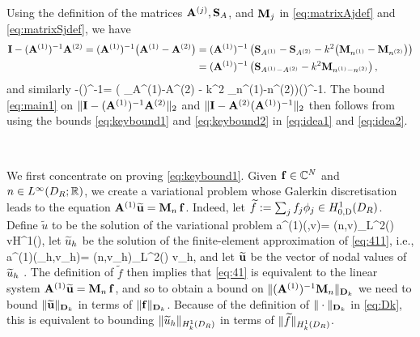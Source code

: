 Using the definition of the matrices $\mathbf{A}^{(j)}, \mathbf{S}_A$, and $\mathbf{M}_{j}$ in \cref{eq:matrixAjdef} and \cref{eq:matrixSjdef}, we have
\begin{align}\nonumber
\mathbf{I} - (\mathbf{A}^{(1)})^{-1}\mathbf{A}^{(2)} = (\mathbf{A}^{(1)})^{-1}\big(\mathbf{A}^{(1)}-\mathbf{A}^{(2)}\big) &=  (\mathbf{A}^{(1)})^{-1}\left( \mathbf{S}_{A^{(1)}} - \mathbf{S}_{A^{(2)}} - k^2 \big(\mathbf{M}_{n^{(1)}}-\mathbf{M}_{n^{(2)}}\big)\right)\\
&= (\mathbf{A}^{(1)})^{-1}\left( \mathbf{S}_{A^{(1)}-A^{(2)}} - k^2 \mathbf{M}_{n^{(1)}-n^{(2)}}\right),\label{eq:idea1}
\end{align}
and similarly 
\beq\label{eq:idea2}
\Imat -\Amatt  (\Amato)^{-1}= \left( \Smat_{A^{(1)}-A^{(2)}} - k^2 \Mmat_{n^{(1)}-n^{(2)}}\right)(\Amato)^{-1}.
\eeq
The bound  \cref{eq:main1} on $\|\mathbf{I} - (\mathbf{A}^{(1)})^{-1}\mathbf{A}^{(2)}\|_2$ and  $\|\mathbf{I} - \mathbf{A}^{(2)}(\mathbf{A}^{(1)})^{-1}\|_2$ then follows from using the bounds \cref{eq:keybound1} and \cref{eq:keybound2} in \cref{eq:idea1} and \cref{eq:idea2}.
%
\epf

\

We first concentrate on proving \cref{eq:keybound1}.
Given $\mathbf{f} \in \mathbb C^N$ and $n\in \LiDRRR$, we create a variational problem whose Galerkin discretisation leads to the equation $\mathbf{A}^{(1)} \widetilde{\mathbf{u}} = \mathbf{M}_n\,\mathbf{f}$.
Indeed, let $\widetilde{f} := \sum_j f_j \phi_j\in \HozDDR$. Define $\widetilde{u}$ to be the solution of the variational problem 
\beq\label{eq:411}
a^{(1)}(,v)= (n,v)_{L^2(\Omega)} \quad{} v\in H^1(\Omega),
\eeq
let $\widetilde{u}_h$ be the solution of the finite-element approximation of \cref{eq:411}, i.e.,
\beq\label{eq:41}
a^{(1)}(\tu_h,v_h)= (n,v_h)_{L^2(\Omega)} \quad{} v_h\in \Vhp,
\eeq
and let $\widetilde{\mathbf{u}}$ be the vector of nodal values of $\widetilde{u}_h$ . The definition of $\widetilde{f}$ then implies that \cref{eq:41} is equivalent to the linear system $\mathbf{A}^{(1)} \widetilde{\mathbf{u}} = \mathbf{M}_{n}\,\mathbf{f}$, and so to obtain a bound on $\|(\mathbf{A}^{(1)})^{-1}\mathbf{M}_n\|_{\mathbf{D}_k}$ we need to bound $\|\widetilde{\mathbf{u}}\|_{\mathbf{D}_k}$ in terms of $\|\mathbf{f}\|_{\mathbf{D}_k}$. Because of the definition 
of $\|\cdot\|_{\mathbf{D}_k}$ in \cref{eq:Dk}, this is equivalent to bounding $\|\tu_h\|_{\HokDR}$ in terms of $\|\widetilde{f}\|_{\HokDR}$.

